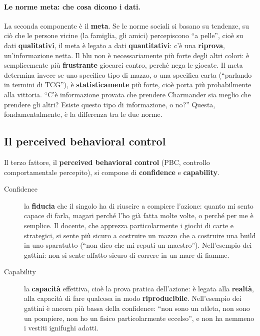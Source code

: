 \paragraph{Le norme meta: che cosa dicono i dati.} La seconda componente è
il \textbf{meta}. Se le norme sociali si basano su tendenze, su ciò che le
persone vicine (la famiglia, gli amici) percepiscono ``a pelle'', cioè su
dati \textbf{qualitativi}, il meta è legato a dati \textbf{quantitativi}: c'è
una \textbf{riprova}, un'informazione netta. Il blu non è necessariamente più
forte degli altri colori: è semplicemente più \textbf{frustrante} giocarci
contro, perché nega le giocate. Il meta determina invece se uno specifico
tipo di mazzo, o una specifica carta (``parlando in termini di TCG''), è
\textbf{statisticamente} più forte, cioè porta più probabilmente alla
vittoria. ``C'è informazione provata che prendere Charmander sia meglio che
prendere gli altri? Esiste questo tipo di informazione, o no?'' Questa,
fondamentalmente, è la differenza tra le due norme.

\subsection{Il perceived behavioral control}

Il terzo fattore, il \textbf{perceived behavioral control} (PBC, controllo
comportamentale percepito), si compone di \textbf{confidence} e
\textbf{capability}.
\begin{description}
  \item[Confidence] la \textbf{fiducia} che il singolo ha di riuscire a
        compiere l'azione: quanto mi sento capace di farla, magari perché
        l'ho già fatta molte volte, o perché per me è semplice. Il docente,
        che apprezza particolarmente i giochi di carte e strategici, si
        sente più sicuro a costruire un mazzo che a costruire una build in
        uno sparatutto (``non dico che mi reputi un maestro''). Nell'esempio
        dei gattini: non si sente affatto sicuro di correre in un mare di
        fiamme.
  \item[Capability] la \textbf{capacità} effettiva, cioè la prova pratica
        dell'azione: è legata alla \textbf{realtà}, alla capacità di fare
        qualcosa in modo \textbf{riproducibile}. Nell'esempio dei gattini è
        ancora più bassa della confidence: ``non sono un atleta, non sono un
        pompiere, non ho un fisico particolarmente eccelso'', e non ha
        nemmeno i vestiti ignifughi adatti.
\end{description}

